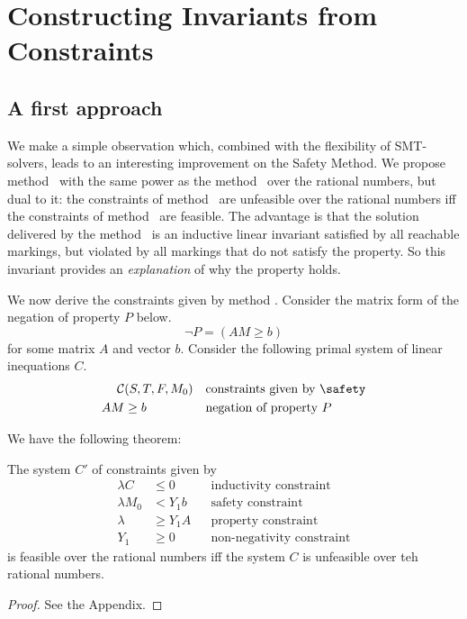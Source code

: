 \section{Constructing Invariants from Constraints}
\label{sec_method_invariant}

\subsection{A first approach}

We make a simple observation which, combined with the flexibility of
SMT-solvers, leads to an interesting improvement on the Safety
Method. We propose method \invariant\ with the same power as the
method \safety\ over the rational numbers, but dual to it: the
constraints of method \safety\ are unfeasible over the rational
numbers if{}f the constraints of method \invariant\ are
feasible. The advantage is that the solution delivered by the
method \invariant\ is an inductive linear invariant satisfied by all
reachable markings, but violated by all markings that do not satisfy
the property. So this invariant provides an {\em explanation} of why
the property holds.

We now derive the constraints given by method \invariant.
Consider the matrix form of the negation of property $P$ below.
$$ \neg P = ( A M \ge b ) $$
for some matrix $A$ and vector $b$.
Consider the following primal system of linear inequations $C$.
\begin{align*}
  \mathcal{C}&(S, T, F, M_0)  && \text{constraints given by \safety} \\
  A M & \ge b                 && \text{negation of property $P$}
\end{align*}

We have the following theorem:

\begin{theorem}
\label{thm:dual}
The system $C'$ of constraints given by
\begin{align*}
  \lambda C    & \le 0     && \text{inductivity constraint} \\
  \lambda M_0  & <   Y_1 b && \text{safety constraint} \\
  \lambda      & \ge Y_1 A && \text{property constraint} \\
  Y_1          & \ge 0     && \text{non-negativity constraint} 
\end{align*}
is feasible over the rational numbers if{}f the system $C$ is unfeasible
over teh rational numbers.
\end{theorem}
\begin{proof}
See the Appendix.
\end{proof}

